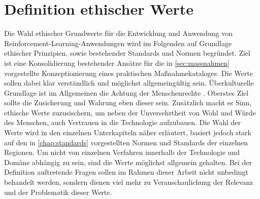 \section{Definition ethischer Werte}\label{sec:def_ethischer_werte}
Die Wahl ethischer Grundwerte für die Entwicklung und Anwendung von Reinforcement-Learning-Anwendungen wird im Folgenden auf Grundlage ethischer Prinzipien, sowie bestehender Standards und Normen begründet.
Ziel ist eine Konsolidierung bestehender Ansätze für die in \autoref{sec:massnahmen} vorgestellte Konzeptionierung eines praktischen Maßnahmekataloges.
Die Werte sollen dabei klar verständlich und möglichst allgemeingültig sein.
Überkulturelle Grundlage ist im Allgemeinen die Achtung der Menschenrechte \cite{vereintenationen1948}.
Oberstes Ziel sollte die Zusicherung und Wahrung eben dieser sein.
Zusätzlich macht es Sinn, ethische Werte zuzusischern, um neben der Unversehrtheit von Wohl und Würde des Menschen, auch Vertrauen in die Technologie aufzubauen.
Die Wahl der Werte wird in den einzelnen Unterkapiteln näher erläutert, basiert jedoch stark auf den in \autoref{chap:standards} vorgestellten Normen und Standards der einzelnen Regionen.
Um nicht von einzelnen Verfahren innerhalb der Technologie und Domäne abhängig zu sein, sind die Werte möglichst allgemein gehalten.
Bei der Definition auftretende Fragen sollen im Rahmen dieser Arbeit nicht unbedingt behandelt werden, sondern dienen viel mehr zu Veranschaulichung der Relevanz und der Problematik dieser Werte.

